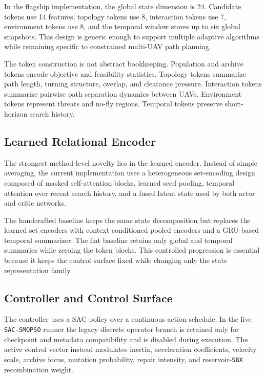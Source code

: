 \documentclass[a4paper,fleqn]{cas-sc}
\begin{document}
In the flagship implementation, the global state dimension is 24. Candidate tokens use 14 features, topology tokens use 8, interaction tokens use 7, environment tokens use 8, and the temporal window stores up to six global snapshots. This design is generic enough to support multiple adaptive algorithms while remaining specific to constrained multi-UAV path planning.

The token construction is not abstract bookkeeping. Population and archive tokens encode objective and feasibility statistics. Topology tokens summarize path length, turning structure, overlap, and clearance pressure. Interaction tokens summarize pairwise path separation dynamics between UAVs. Environment tokens represent threats and no-fly regions. Temporal tokens preserve short-horizon search history.

\subsection{Learned Relational Encoder}

The strongest method-level novelty lies in the learned encoder. Instead of simple averaging, the current implementation uses a heterogeneous set-encoding design composed of masked self-attention blocks, learned seed pooling, temporal attention over recent search history, and a fused latent state used by both actor and critic networks.

The handcrafted baseline keeps the same state decomposition but replaces the learned set encoders with context-conditioned pooled encoders and a GRU-based temporal summarizer. The flat baseline retains only global and temporal summaries while zeroing the token blocks. This controlled progression is essential because it keeps the control surface fixed while changing only the state representation family.

\subsection{Controller and Control Surface}

The controller uses a SAC policy over a continuous action schedule. In the live \texttt{SAC-SMOPSO} runner the legacy discrete operator branch is retained only for checkpoint and metadata compatibility and is disabled during execution. The active control vector instead modulates inertia, acceleration coefficients, velocity scale, archive focus, mutation probability, repair intensity, and reservoir-\texttt{SBX} recombination weight.
\end{document}
